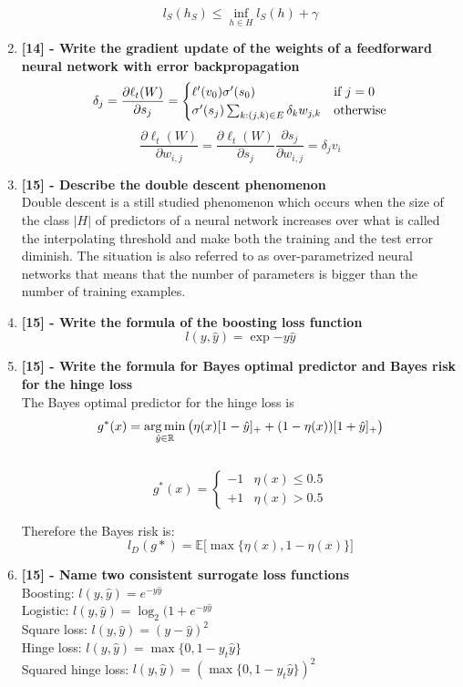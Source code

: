 \documentclass[a4paper]{report}
\DeclareMathOperator*{\argmin}{arg\,min}
\begin{document}
\begin{enumerate}
    \[l_S (h_S) \leq \inf_{h \in H}l_S (h) + \gamma\]
    \item \textbf{[14] - Write the gradient update of the weights of a feedforward neural network with error backpropagation}\\
    \[\delta_j = \frac{\partial\ell_t(W)}{\partial s_j} \\
    = \begin{cases}
    \ell'(v_0) \sigma'(s_0) & \text{if } j = 0 \\
    \sigma'(s_j) \sum_{k : (j,k) \in E} \delta_k w_{j,k} &  \text{otherwise}
    \end{cases} \]
    \[\frac{\partial\ell_t(W)}{\partial w_{i,j}} =  \frac{\partial\ell_t(W)}{\partial s_j} \frac{\partial    s_j}{\partial w_{i,j}} = \delta_j v_i\] 
    \item \textbf{[15] - Describe the double descent phenomenon}\\
    Double descent is a still studied phenomenon which occurs when the size of the class $|H|$ of predictors of a neural network increases over what is called the interpolating threshold and make both the training and the test error diminish. The situation is also referred to as over-parametrized neural networks that means that the number of parameters is bigger than the number of training examples.
    \item \textbf{[15] - Write the formula of the boosting loss function}\\
    \[l(y, \hat{y}) = \exp{-y\hat{y}}\]
    \item \textbf{[15] - Write the formula for Bayes optimal predictor and Bayes risk for the hinge loss}\\
    The Bayes optimal predictor for the hinge loss is \[g^* (x) = \argmin_{\hat{y} \in \mathbb{R}}\big(\eta\small(x\small)[1-\hat{y}]_+ + (1-\eta\small(x\small))[1+\hat{y}]_+\big)\]\\
    \[
    g^* (x) = 
    \begin{cases}
    -1 &\eta(x) \leq 0.5\\
    +1 &\eta(x) > 0.5    
    \end{cases}
    \]

    Therefore the Bayes risk is:
    \[
    l_D (g*) = \mathbb{E} \big[\max\{{\eta(x), 1 - \eta(x)}\}\big]
    \]
    \item \textbf{[15] - Name two consistent surrogate loss functions}\\
        Boosting: $l(y, \hat{y}) = e^{-y\hat{y}}$\\
        Logistic: $l(y, \hat{y}) = \log_2 (1 + e^{-y\hat{y}}$\\
        Square loss: $l(y, \hat{y}) = (y - \hat{y})^2$\\
        Hinge loss: $l(y, \hat{y}) = \max\{0, 1 - y_t \hat{y}\}$\\
        Squared hinge loss: $l(y, \hat{y}) = (\max\{0, 1 - y_t \hat{y}\})^2$
\end{enumerate}
\end{document}
